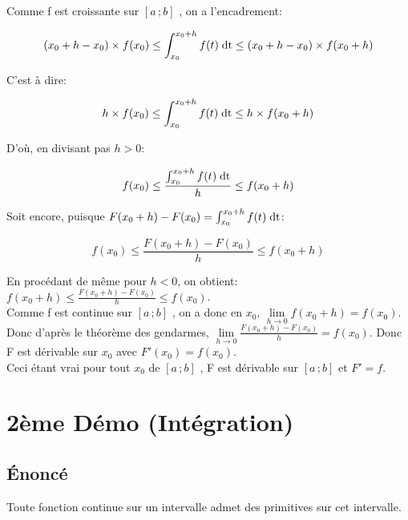 \documentclass[12px]{article}
\newcommand\I{$[a\,;b]$ }
\begin{document}
	Comme f est croissante sur \I, on a l'encadrement:
	\begin{center}
		\begin{displaymath}
			(x_0 +h -x_0 ) \times f(x_0) 
				\leq 
			\int_{x_0}^{x_0 +h}f(t)\; \mathrm{dt} 
				\leq 
			(x_0 +h -x_0) \times f(x_0 +h)
		\end{displaymath}
	\end{center}
	C'est à dire:
	\begin{center}
		\begin{displaymath}
			h \times f(x_0) 
			\leq 
			\int_{x_0}^{x_0 +h}f(t)\; \mathrm{dt} 
			\leq 
			h \times f(x_0 +h)
		\end{displaymath}
	\end{center}
	\newpage
	D'où, en divisant pas $h>0$:
	\begin{center}
		\begin{displaymath}
			f(x_0) \leq \frac{\int_{x_0}^{x_0 +h}f(t)\; \mathrm{dt}}{h} \leq f(x_0 +h)
		\end{displaymath}
	\end{center}
	Soit encore, puisque $F(x_0 +h) - F(x_0) = \int_{x_0}^{x_0 +h}f(t)\; \mathrm{dt}$:
	\begin{center}
		\begin{displaymath}
			f(x_0) \leq \frac{F(x_0 +h) - F(x_0)}{h} \leq f(x_0 +h)
		\end{displaymath}
	\end{center}
	En procédant de même pour $h<0$, on obtient:
	$f(x_0 +h) \leq \frac{F(x_0 +h) - F(x_0)}{h} \leq f(x_0)$.\\
	Comme f est continue sur \I, on a donc en $x_0,\, \lim\limits_{h \rightarrow 0} f(x_0 +h) = f(x_0)$.\\
	Donc d'après le théorème des gendarmes, 
	$\lim\limits_{h \rightarrow 0}\frac{F(x_0 +h) - F(x_0)}{h} = f(x_0)$.
	Donc F est dérivable sur $x_0$ avec $F'(x_0) = f(x_0)$.\\
	Ceci étant vrai pour tout $x_0$ de \I, F est dérivable sur \I et $F'=f$.
	
	
	\section{2ème Démo (Intégration)}
	
	\subsection{\'Enoncé}
	Toute fonction continue sur un intervalle admet des primitives sur cet intervalle.
	
\end{document}
